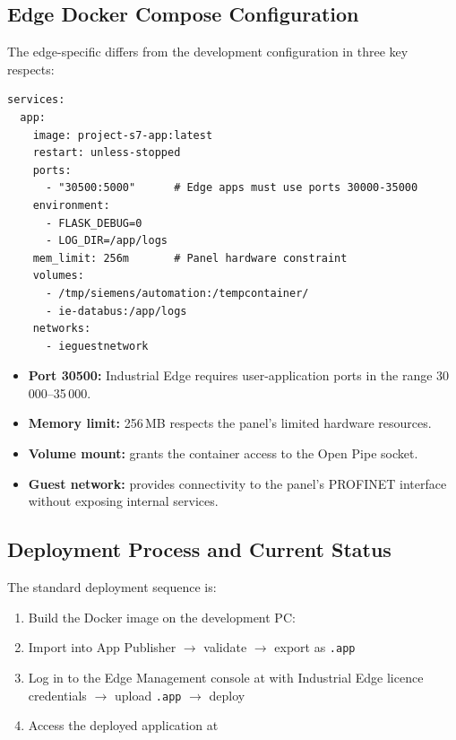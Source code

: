 \subsection{Edge Docker Compose Configuration}

The edge-specific  differs from the development configuration
in three key respects:

\begin{lstlisting}[style=yaml,
  caption={Edge Docker Compose configuration (\texttt{docker-compose.edge.yml}).},
  label={lst:edgecompose}]
services:
  app:
    image: project-s7-app:latest
    restart: unless-stopped
    ports:
      - "30500:5000"      # Edge apps must use ports 30000-35000
    environment:
      - FLASK_DEBUG=0
      - LOG_DIR=/app/logs
    mem_limit: 256m       # Panel hardware constraint
    volumes:
      - /tmp/siemens/automation:/tempcontainer/
      - ie-databus:/app/logs
    networks:
      - ieguestnetwork
\end{lstlisting}

\begin{itemize}[leftmargin=*, itemsep=3pt]
  \item \textbf{Port 30500:} Industrial Edge requires user-application ports in the range
    30\,000--35\,000.
  \item \textbf{Memory limit:} 256\,MB respects the panel's limited hardware resources.
  \item \textbf{Volume mount:}  grants the container access
    to the Open Pipe socket.
  \item \textbf{Guest network:}  provides connectivity to the panel's
    PROFINET interface without exposing internal services.
\end{itemize}

\subsection{Deployment Process and Current Status}

The standard deployment sequence is:
\begin{enumerate}[leftmargin=*, itemsep=3pt]
  \item Build the Docker image on the development PC:
  \item Import  into App Publisher $\rightarrow$
    validate $\rightarrow$ export as \texttt{.app}
  \item Log in to the Edge Management console at  with
    Industrial Edge licence credentials $\rightarrow$ upload \texttt{.app} $\rightarrow$ deploy
  \item Access the deployed application at 
\end{enumerate}

